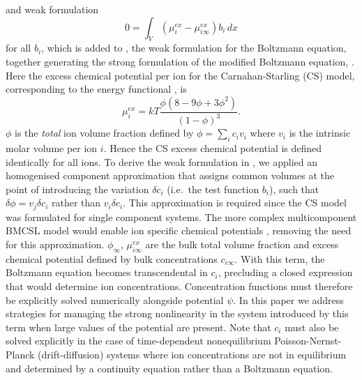 and weak formulation
\begin{equation}
    0 = \int_{V} (\mu_i^{ex}-\mu_{i\infty}^{ex}) b_i \, dx
    \label{weak_CS}
\end{equation}
for all $b_i$, which is added to , the weak
formulation for the Boltzmann equation, together generating the strong
formulation of the modified Boltzmann
equation,  .  Here the excess chemical potential
per ion for the Carnahan-Starling (CS) model, corresponding to the energy
functional , is
\begin{equation}
    \mu_{i}^{ex} = kT \frac{\phi(8-9\phi+3\phi^2)}{(1-\phi)^3}.
    \label{chem_pot_CS}
\end{equation}
$\phi$ is the \emph{total} ion volume fraction defined by
$\phi=\sum_i c_i v_i$ where $v_i$ is the intrinsic molar volume per
ion $i$. Hence the CS excess chemical potential is defined identically
for all ions. To derive the weak formulation in , we
applied an homogenised component approximation that assigns common
volumes at the point of introducing the variation  $\delta c_i$ (i.e.\
the test function $b_i$), such that $\delta\phi=v_j \delta c_i$ rather 
than $v_i \delta c_i$. This approximation is required since the CS
model was formulated for single component systems. The more complex
multicomponent BMCSL model would enable ion specific chemical
potentials \citep{MansooriCarnahanStarlingLeland1971}, removing the
need for this approximation.  $\phi_{\infty}$, $\mu_{i\infty}^{ex}$
are the bulk total volume fraction and excess chemical potential
defined by bulk concentrations $c_{i\infty}$. With this term, the
Boltzmann equation \eqnref{general_Boltzmann} becomes transcendental in $c_i$, precluding a closed
expression that would determine ion concentrations. Concentration functions must therefore be
explicitly solved  numerically alongside potential $\psi$. In this
paper we address strategies for managing the strong nonlinearity in
the system introduced by this term when large values of the
potential are present. Note that $c_i$ must also be solved explicitly in the case
of time-dependent nonequilibrium Poisson-Nernst-Planck (drift-diffusion) systems \citep{LopezGarciaHornoGrosse2018} where
ion concentrations are not in equilibrium and determined by a
continuity equation rather than a Boltzmann equation.

